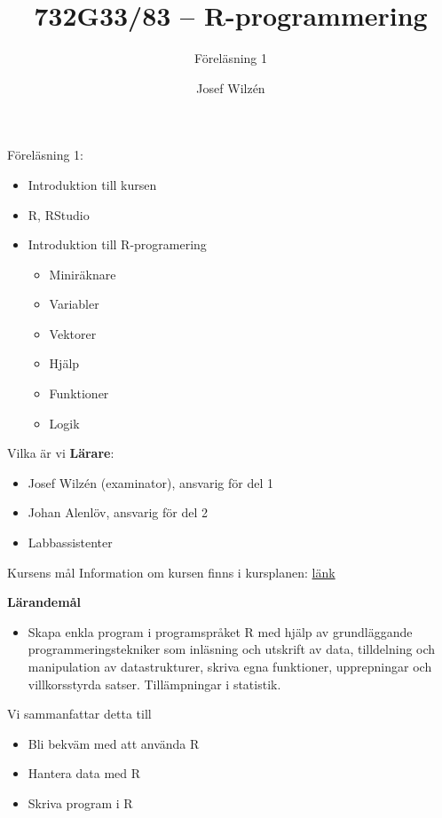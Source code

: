 \documentclass[
  10pt,
  ignorenonframetext,
]{beamer}
\title{732G33/83 -- R-programmering}
\subtitle{Föreläsning 1}
\author{Josef Wilzén}
\date{}
\institute{Linköpings Universitet}
\providecommand{\tightlist}{%
  \setlength{\itemsep}{0pt}\setlength{\parskip}{0pt}}
\begin{document}
\frame{\titlepage}

\begin{frame}{Föreläsning 1:}
\protect\hypertarget{fuxf6reluxe4sning-1}{}
\begin{itemize}
\tightlist
\item
  Introduktion till kursen 
\item
  R, RStudio
\item
  Introduktion till R-programering

  \begin{itemize}
  \tightlist
  \item
    Miniräknare
  \item
    Variabler
  \item
    Vektorer
  \item
    Hjälp
  \item
    Funktioner
  \item
    Logik
  \end{itemize}
\end{itemize}
\end{frame}

\begin{frame}{Vilka är vi}
\protect\hypertarget{vilka-uxe4r-vi}{}
\textbf{Lärare}:

\begin{itemize}
\tightlist
\item
  Josef Wilzén (examinator), ansvarig för del 1
\item 
  Johan Alenlöv, ansvarig för del 2
\item 
  Labbassistenter
\end{itemize}

\end{frame}

\begin{frame}{Kursens mål}
\protect\hypertarget{kursens-muxe5l}{}
Information om kursen finns i kursplanen: \href{https://studieinfo.liu.se/kurs/732g33}{länk}

\textbf{Lärandemål}

\begin{itemize}
\tightlist
\item
  Skapa enkla program i programspråket R med hjälp av grundläggande
  programmeringstekniker som inläsning och utskrift av data, tilldelning
  och manipulation av datastrukturer, skriva egna funktioner,
  upprepningar och villkorsstyrda satser. Tillämpningar i statistik.
\end{itemize}

\pause Vi sammanfattar detta till

\begin{itemize}
\tightlist
\item
  Bli bekväm med att använda R
\item
  Hantera data med R
\item
  Skriva program i R
\end{itemize}
\end{frame}
\end{document}
